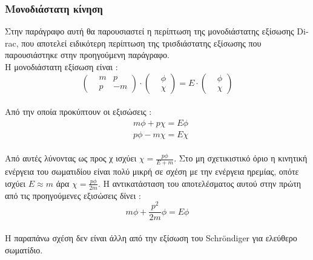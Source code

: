 \subsubsection{Μονοδιάστατη κίνηση}
Στην παράγραφο αυτή θα παρουσιαστεί η περίπτωση της μονοδιάστατης εξίσωσης \textlatin{Dirac}, που αποτελεί ειδικότερη περίπτωση της τρισδιάστατης εξίσωσης που παρουσιάστηκε στην προηγούμενη παράγραφο.\\ 
Η μονοδιάστατη εξίσωση είναι : 
\[
\begin{pmatrix}
  &m &p\\
  &p &-m
\end{pmatrix}
\cdot
\begin{pmatrix}
  &\phi\\
  &\chi
\end{pmatrix}
= E \cdot
\begin{pmatrix}
  &\phi\\
  &\chi
\end{pmatrix}
\]
\\
Από την οποία προκύπτουν οι εξισώσεις : \\
\begin{align*}
  &m\phi+p\chi=E\phi
  \\&p\phi-m\chi=E\chi
\end{align*}\\
Από αυτές λύνοντας ως προς χ ισχύει $ \chi =\frac{p\phi}{E+m}$. Στο μη σχετικιστικό όριο η κινητική ενέργεια του σωματιδίου είναι πολύ μικρή σε σχέση με την ενέργεια ηρεμίας, οπότε ισχύει  $E \approx m$ άρα $ \chi =\frac{p\phi}{2m}$. Η αντικατάσταση του αποτελέσματος αυτού στην πρώτη από τις προηγούμενες εξισώσεις δίνει :\\
\[ m\phi +\frac{p^2}{2m}\phi=E\phi \]\\
Η παραπάνω σχέση δεν είναι άλλη από την εξίσωση του \textlatin{Schr\"ondiger} για ελεύθερο σωματίδιο.\\
